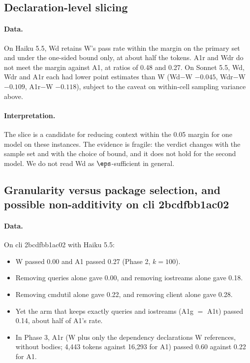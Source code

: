 \subsection{Declaration-level slicing}

\paragraph{Data.} On Haiku 5.5, Wd retains W's pass rate within the margin on the primary set and under the one-sided bound only, at about half the tokens. A1r and Wdr do not meet the margin against A1, at ratios of 0.48 and 0.27. On Sonnet 5.5, Wd, Wdr and A1r each had lower point estimates than W (Wd$-$W $-0.045$, Wdr$-$W $-0.109$, A1r$-$W $-0.118$), subject to the caveat on within-cell sampling variance above.

\paragraph{Interpretation.} The slice is a candidate for reducing context within the 0.05 margin for one model on these instances. The evidence is fragile: the verdict changes with the sample set and with the choice of bound, and it does not hold for the second model. We do not read Wd as $\eps$-sufficient in general.

\subsection{Granularity versus package selection, and possible non-additivity on cli 2bcdfbb1ac02}

\paragraph{Data.} On cli 2bcdfbb1ac02 with Haiku 5.5:
\begin{itemize}
\item W passed 0.00 and A1 passed 0.27 (Phase 2, $k=100$).
\item Removing queries alone gave 0.00, and removing iostreams alone gave 0.18.
\item Removing cmdutil alone gave 0.22, and removing client alone gave 0.28.
\item Yet the arm that keeps exactly queries and iostreams (A1g $=$ A1t) passed 0.14, about half of A1's rate.
\item In Phase 3, A1r (W plus only the dependency declarations W references, without bodies; 4,443 tokens against 16,293 for A1) passed 0.60 against 0.22 for A1.
\end{itemize}

